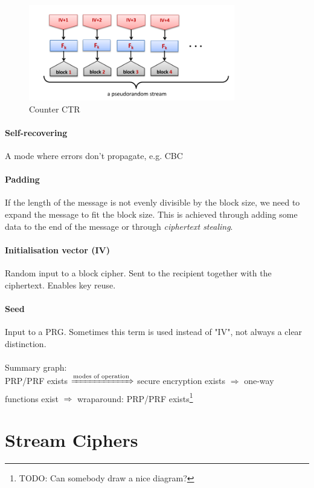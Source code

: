 \begin{figure}[h!]
    \centering
    \includegraphics[width=9cm]{images/ch2-bc-ctr.png}
    \caption{Counter CTR}
    \label{fig:bc-ctr}
\end{figure}

\paragraph{Self-recovering} A mode where errors don't propagate, e.g. CBC

\paragraph{Padding} If the length of the message is not evenly divisible by the block size, we need to expand the message to fit the block size. This is achieved through adding some data to the end of the message or through \textit{ciphertext stealing}.

\paragraph{Initialisation vector (IV)} Random input to a block cipher. Sent to the recipient together with the ciphertext. Enables key reuse.

\paragraph{Seed} Input to a PRG. Sometimes this term is used instead of "IV", not always a clear distinction.
\\ \\
Summary graph: \\
PRP/PRF exists $\xRightarrow[]{\text{modes of operation}}$ secure encryption exists $\Rightarrow$ one-way functions exist $\Rightarrow$ wraparound: PRP/PRF exists\footnote{TODO: Can somebody draw a nice diagram?}


%
%
\newpage
\section{Stream Ciphers}

